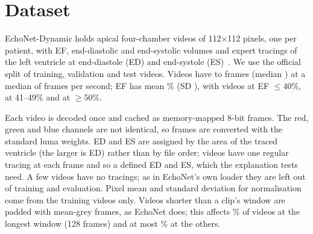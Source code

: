 \documentclass[conference]{IEEEtran}
\begin{document}
\section{Dataset}
EchoNet-Dynamic holds \edaNAll{} apical four-chamber videos of 112$\times$112 pixels,
one per patient, with EF, end-diastolic and end-systolic volumes and expert tracings of the
left ventricle at end-diastole (ED) and end-systole (ES)~\cite{ouyang2019ml4h}. We use the
official split of \edaNTrain{} training, \edaNVal{} validation and \edaNTest{} test videos.
Videos have \edaFramesminAll{} to \edaFramesmaxAll{} frames (median \edaFramesmedianAll{}) at
a median of \edaFpsmedianAll{} frames per second; EF has mean \edaEfmeanAll{}\% (SD \edaEfsdAll{}), with
\edaNefleFourZeroAll{} videos at EF $\le 40$\%, \edaNefFourOneFourNineAll{} at 41--49\% and
\edaNefgeFiveZeroAll{} at $\ge 50$\%.

Each video is decoded once and cached as memory-mapped 8-bit frames. The red, green and blue
channels are not identical, so frames are converted with the standard luma weights. ED and ES are
assigned by the area of the traced ventricle (the larger is ED) rather than by file order;
\edaNhastraceAll{} videos have one regular tracing at each frame and so a defined ED and ES,
which the explanation tests need. A few videos have no tracings; as in EchoNet's own loader they
are left out of training and evaluation. Pixel mean and standard deviation for normalisation come
from the training videos only. Videos shorter than a clip's window are padded with mean-grey
frames, as EchoNet does; this affects \edaSharepaddedFsSixtyFour\% of videos at the longest
window (128 frames) and at most \edaSharepaddedFsThirtyTwo\% at the others.
\end{document}
